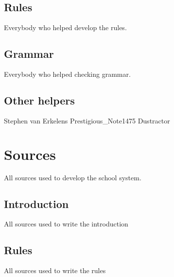 \documentclass[titlepage]{article}
\begin{document}
\subsection{Rules}
Everybody who helped develop the rules.
\subsection{Grammar}
Everybody who helped checking grammar.
\subsection{Other helpers}
Stephen van Erkelens
\newline
Prestigious\_Note1475
\newline
Dustractor

\newpage
\section{Sources}
All sources used to develop the school system.
\subsection{Introduction}
All sources used to write the introduction
\subsection{Rules}
All sources used to write the rules
\end{document}
